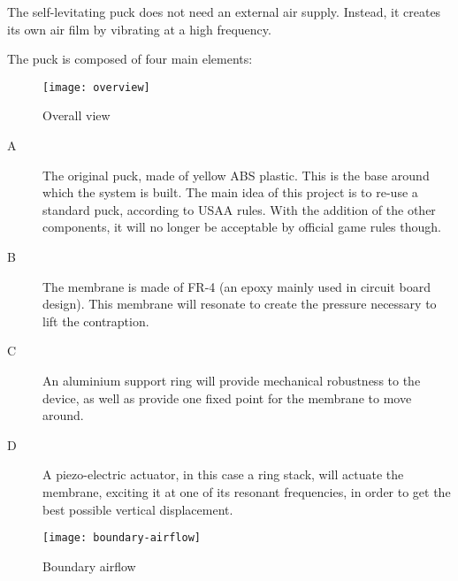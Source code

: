 
The self-levitating puck does not need an external air supply. Instead, it
creates its own air film by vibrating at a high frequency.

The puck is composed of four main elements:

\begin{figure}[h]
  \begin{center}
    \texttt{[image: overview]}
  \end{center}
  \caption{Overall view}
  \label{fig:overview}
\end{figure}

\begin{description}
  \item[A] The original puck, made of yellow ABS plastic. This is the base
    around which the system is built. The main idea of this project is to re-use
    a standard puck, according to USAA rules. With the addition of the other
    components, it will no longer be acceptable by official game rules though.
  \item[B] The membrane is made of FR-4 (an epoxy mainly used in circuit board
    design). This membrane will resonate to create the pressure necessary to
    lift the contraption.
  \item[C] An aluminium support ring will provide mechanical robustness to the
    device, as well as provide one fixed point for the membrane to move around.
  \item[D] A piezo-electric actuator, in this case a ring stack, will actuate
    the membrane, exciting it at one of its resonant frequencies, in order to
    get the best possible vertical displacement.
\end{description}


\begin{figure}[h]
  \begin{center}
    \texttt{[image: boundary-airflow]}
  \end{center}
  \caption{Boundary airflow}
  \label{fig:boundary-airflow}
\end{figure}

